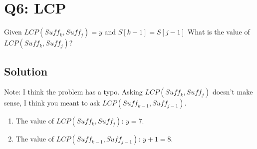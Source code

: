 \section*{Q6: LCP}

Given $LCP(Suff_k,Suff_j)=y$ and $S[k-1]=S[j-1]$
What is the value of $LCP(Suff_k,Suff_j)$?

\subsection*{Solution}

Note: I think the problem has a typo.
Asking $LCP(Suff_k,Suff_j)$ doesn't make sense, I think you meant to ask $LCP(Suff_{k-1},Suff_{j-1})$.

\begin{enumerate}
    \item The value of $LCP(Suff_k,Suff_j)$: $y = 7$.
    \item The value of $LCP(Suff_{k-1},Suff_{j-1})$: $y + 1 = 8$.
\end{enumerate}
